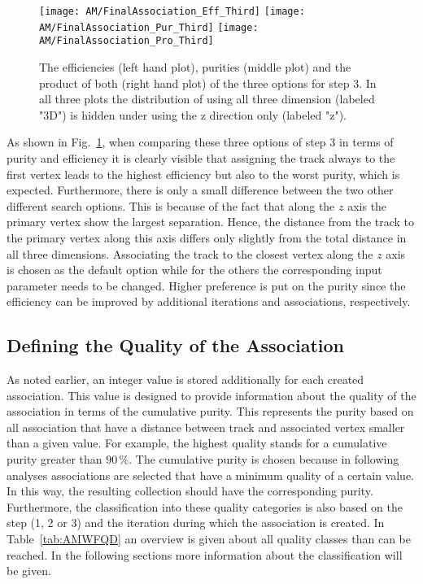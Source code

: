 \begin{figure}[Ht]
    \centering
    \texttt{[image: AM/FinalAssociation\_Eff\_Third]}
    \texttt{[image: AM/FinalAssociation\_Pur\_Third]}
    \texttt{[image: AM/FinalAssociation\_Pro\_Third]}
    \caption[Efficiencies, purities and their product of the three options of step 3]{The efficiencies (left hand plot), purities (middle plot) and the product of both (right hand plot) of the three options for step 3. In all three plots the distribution of using all three dimension (labeled "3D") is hidden under using the z direction only (labeled "z"). \label{plot:AMWFFA}}
\end{figure}

As shown in Fig.~\ref{plot:AMWFFA}, when comparing these three options of step 3 in terms of purity and efficiency it is clearly visible that assigning the track always to the first vertex leads to the highest efficiency but also to the worst purity, which is expected. Furthermore, there is only a small difference between the two other different search options. This is because of the fact that along the $z$ axis the primary vertex show the largest separation. Hence, the distance from the track to the primary vertex along this axis differs only slightly from the total distance in all three dimensions. Associating the track to the closest vertex along the $z$ axis is chosen as the default option while for the others the corresponding input parameter needs to be changed. Higher preference is put on the purity since the efficiency can be improved by additional iterations and associations, respectively.


\subsection{Defining the Quality of the Association\label{sec:AMWFQD}}

As noted earlier, an integer value is stored additionally for each created association. This value is designed to provide information about the quality of the association in terms of the cumulative purity. This represents the purity based on all association that have a distance between track and associated vertex smaller than a given value. For example, the highest quality stands for a cumulative purity greater than $90\,\%$. The cumulative purity is chosen because in following analyses associations are selected that have a minimum quality of a certain value. In this way, the resulting collection should have the corresponding purity.  Furthermore, the classification into these quality categories is also based on the step (1, 2 or 3) and the iteration during which the association is created. In Table~\ref{tab:AMWFQD} an overview is given about all quality classes than can be reached. In the following sections more information about the classification will be given.

